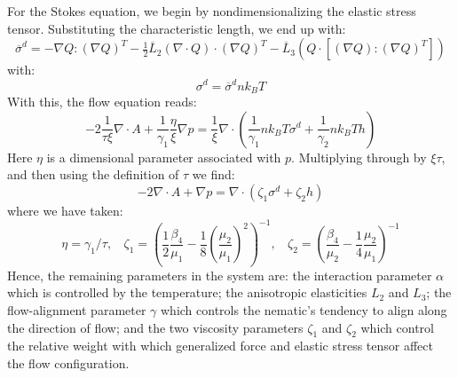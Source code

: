 \documentclass[reqno]{article}
\begin{document}
  For the Stokes equation, we begin by nondimensionalizing the elastic stress
  tensor.
  Substituting the characteristic length, we end up with:
  \begin{equation}
    \overline{\sigma}^d
    =
    - \nabla Q : \left( \nabla Q \right)^T
    - \tfrac12 \overline{L}_2 \left( \nabla \cdot Q \right) \cdot \left( \nabla Q \right)^T
    - \overline{L}_3 \left( Q \cdot \left[ \left( \nabla Q \right) : \left( \nabla Q \right)^T \right] \right)
  \end{equation}
  with:
  \begin{equation}
    \sigma^d = \overline{\sigma}^d n k_B T
  \end{equation}
  With this, the flow equation reads:
  \begin{equation}
    -2 \frac{1}{\tau \xi} \nabla \cdot A
    + \frac{1}{\gamma_1} \frac{\eta}{\xi} \nabla p
    =
    \frac{1}{\xi} \nabla \cdot \left(
      \frac{1}{\gamma_1} n k_B T \sigma^d
      + \frac{1}{\gamma_2} n k_B T h
    \right)
  \end{equation}
  Here $\eta$ is a dimensional parameter associated with $p$.
  Multiplying through by $\xi \tau$, and then using the definition of $\tau$ we
  find:
  \begin{equation} \label{eq:stokes-nondimensionalized}
    -2 \nabla \cdot A
    + \nabla p
    =
    \nabla \cdot \left(
      \zeta_1 \sigma^d
      + \zeta_2 h
    \right)
  \end{equation}
  where we have taken:
  \begin{equation}
    \eta = \gamma_1 / \tau, \:\:\:\:
    \zeta_1 = \left( \frac12 \frac{\beta_4}{\mu_1} - \frac18 \left( \frac{\mu_2}{\mu_1} \right)^2 \right)^{-1}, \:\:\:\:
    \zeta_2 = \left( \frac{\beta_4}{\mu_2} - \frac14 \frac{\mu_2}{\mu_1} \right)^{-1}
  \end{equation}
  Hence, the remaining parameters in the system are: the interaction parameter
  $\alpha$ which is controlled by the temperature; the anisotropic elasticities
  $L_2$ and $L_3$; the flow-alignment parameter $\gamma$ which controls the
  nematic's tendency to align along the direction of flow; and the two viscosity
  parameters $\zeta_1$ and $\zeta_2$ which control the relative weight with which
  generalized force and elastic stress tensor affect the flow configuration.
  
\end{document}
